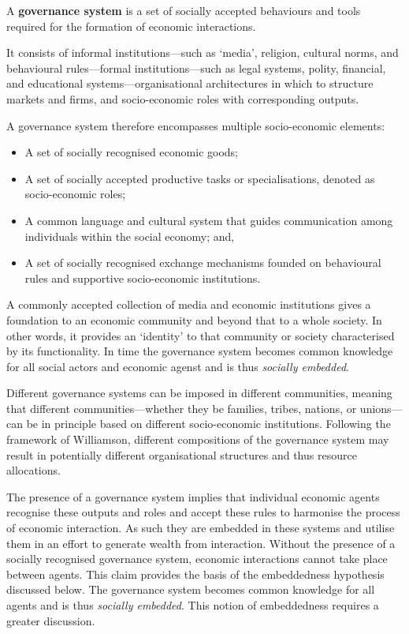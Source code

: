 \begin{definition} \label{def:governancesystem}
A \textbf{governance system} is a set of socially accepted behaviours and tools required for the formation of economic interactions.

It consists of informal institutions---such as `media', religion, cultural norms, and behavioural rules---formal institutions---such as legal systems, polity, financial, and educational systems---organisational architectures in which to structure markets and firms, and socio-economic roles with corresponding outputs.
\end{definition}
A governance system therefore encompasses multiple socio-economic elements: 
\begin{itemize}
\item A set of socially recognised economic goods; 
\item A set of socially accepted productive tasks or specialisations, denoted as socio-economic roles; 
\item A common language and cultural system that guides communication among individuals within the social economy; and, 
\item A set of socially recognised exchange mechanisms founded on behavioural rules and supportive socio-economic institutions. 
\end{itemize}
A commonly accepted collection of media and economic institutions gives a foundation to an economic community and beyond that to a whole society. In other words, it provides an `identity' to that community or society characterised by its functionality. In time the governance system becomes common knowledge for all social actors and economic agenst and is thus \emph{socially embedded}.

Different governance systems can be imposed in different communities, meaning that different communities---whether they be families, tribes, nations, or unions---can be in principle based on different socio-economic institutions. Following the framework of Williamson, different compositions of the governance system may result in potentially different organisational structures and thus resource allocations.

The presence of a governance system implies that individual economic agents recognise these outputs and roles and accept these rules to harmonise the process of economic interaction. As such they are embedded in these systems and utilise them in an effort to generate wealth from interaction. Without the presence of a socially recognised governance system, economic interactions cannot take place between agents. This claim provides the basis of the embeddedness hypothesis discussed below. The governance system becomes common knowledge for all agents and is thus \emph{socially embedded}. This notion of embeddedness requires a greater discussion.

